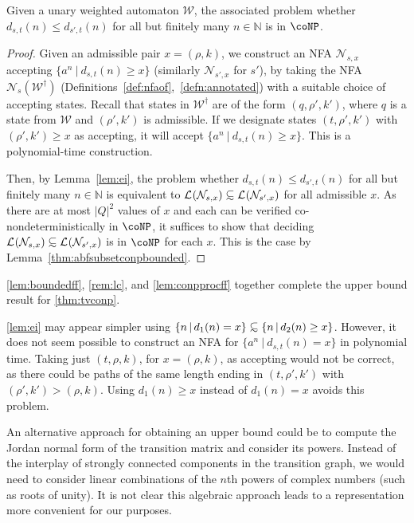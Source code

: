 \documentclass[10pt,a4paper]{amsart}
\numberwithin{equation}{section}
\theoremstyle{plain}
\theoremstyle{definition}
\theoremstyle{remark}
\newcommand\lng[2]{\mathcal{L}_{#1}(#2)}
\newcommand\waannotated{\wa^\dagger}
\newcommand\dgf{d}
\newcommand\nfa{\mathcal{N}}
\newcommand\wa{\mathcal{W}}
\newcommand\nfaof[2]{\nfa_{#2}(#1)}
\newcommand\abfsubset{\mathrel{{\ooalign{\hss\raisebox{-0.6ex}{\small$\sim$}\hss\cr\raisebox{0.4ex}{$\subset$}}}}
}
\begin{document}
\begin{lem} \label{lem:conpprocff}
Given a unary weighted automaton $\wa$, the associated problem whether $\dgf_{s,t}(n) \le \dgf_{s',t}(n)$ for all but finitely many $n \in \mathbb{N}$ is in $\coNP$.
\end{lem}
\begin{proof}
Given an admissible pair $x=(\rho,k)$, we construct an NFA $\nfa_{s,x}$ accepting $\{a^n \ | \ \dgf_{s,t}(n) \ge x\}$ (similarly $\nfa_{s',x}$ for $s'$), by taking the NFA $\nfaof{\waannotated}{s}$ (Definitions~\ref{def:nfaof},~\ref{defn:annotated}) with a suitable choice of accepting states.
Recall that states in $\waannotated$ are of the form $(q,\rho',k')$, where $q$ is a state from $\wa$ and $(\rho',k')$ is admissible.
If we designate states $(t,\rho',k')$ with $(\rho',k')\ge x$ as accepting, it will accept  $\{a^n \ | \ \dgf_{s,t}(n) \ge x\}$.
This is a polynomial-time construction.

Then, by Lemma~\ref{lem:ei}, the problem whether $\dgf_{s,t}(n) \le \dgf_{s',t}(n)$ for all but finitely many $n \in \mathbb{N}$
is equivalent to $\lng{}{\nfa_{s,x}}\abfsubset \lng{}{\nfa_{s',x}}$ for all admissible $x$.
As there are at most $|Q|^2$ values of $x$ and each can be verified co-nondeterministically in $\coNP$, it suffices to show that deciding $\lng{}{\nfa_{s,x}}\abfsubset \lng{}{\nfa_{s',x}}$ is in $\coNP$ for each $x$.
This is the case by  Lemma~\ref{thm:abfsubsetconpbounded}.
\end{proof}

\cref{lem:boundedff}, \cref{rem:lc}, and \cref{lem:conpprocff} together complete the  upper bound result for \cref{thm:tvconp}.

\begin{rem}
\cref{lem:ei} may appear simpler using $\{ n\,|\, \dgf_1(n) = x\} \abfsubset \{ n\,|\, \dgf_2(n) \ge x\}$.
However, it does not seem possible to construct an NFA
for $\{a^n \ | \ \dgf_{s,t}(n) = x\}$ in polynomial time.  Taking just $(t,\rho,k)$, for $x = (\rho,k)$, as accepting
would not be correct, as there could be paths of the same length ending in $(t,\rho',k')$ with $(\rho',k')>(\rho,k)$.
Using $\dgf_1(n) \ge x$ instead of $\dgf_1(n) = x$ avoids this problem.
\end{rem}

\begin{rem}An alternative approach for obtaining an upper bound could be to compute the Jordan normal form of the transition matrix and consider
its powers. Instead of the interplay of strongly connected components
in the transition graph, we would need to consider linear combinations of
the $n$th powers of complex numbers (such as roots of unity).
It is not clear this algebraic approach leads to
a  representation more convenient for our purposes.
\end{rem}
\end{document}
